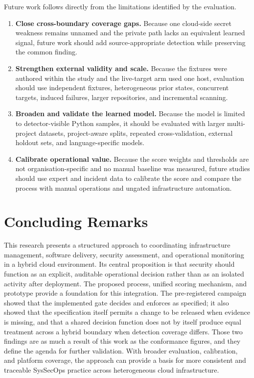 Future work follows directly from the limitations identified by the evaluation.

\begin{enumerate}
    \item \textbf{Close cross-boundary coverage gaps.} Because one cloud-side secret
    weakness remains unnamed and the private path lacks an equivalent learned signal,
    future work should add source-appropriate detection while preserving the common
    finding.

    \item \textbf{Strengthen external validity and scale.} Because the fixtures were
    authored within the study and the live-target arm used one host, evaluation should use
    independent fixtures, heterogeneous prior states, concurrent targets, induced
    failures, larger repositories, and incremental scanning.

    \item \textbf{Broaden and validate the learned model.} Because the model is limited
    to detector-visible Python samples, it should be evaluated with larger multi-project
    datasets, project-aware splits, repeated cross-validation, external holdout sets, and
    language-specific models.

    \item \textbf{Calibrate operational value.} Because the score weights and thresholds
    are not organisation-specific and no manual baseline was measured, future studies
    should use expert and incident data to calibrate the score and compare the process
    with manual operations and ungated infrastructure automation.
\end{enumerate}

\section{Concluding Remarks}
\label{sec:conclusion-remarks}

This research presents a structured approach to coordinating infrastructure management,
software delivery, security assessment, and operational monitoring in a hybrid cloud
environment. Its central proposition is that security should function as an explicit,
auditable operational decision rather than as an isolated activity after deployment.
The proposed process, unified scoring mechanism, and prototype provide a foundation for
this integration. The pre-registered campaign showed that the implemented gate decides
and enforces as specified; it also showed that the specification itself permits a change
to be released when evidence is missing, and that a shared decision function does not by
itself produce equal treatment across a hybrid boundary when detection coverage differs.
Those two findings are as much a result of this work as the conformance figures, and
they define the agenda for further validation. With broader evaluation, calibration, and
platform coverage, the approach can provide a basis for more consistent and traceable
SysSecOps practice across heterogeneous cloud infrastructure.

\endinput